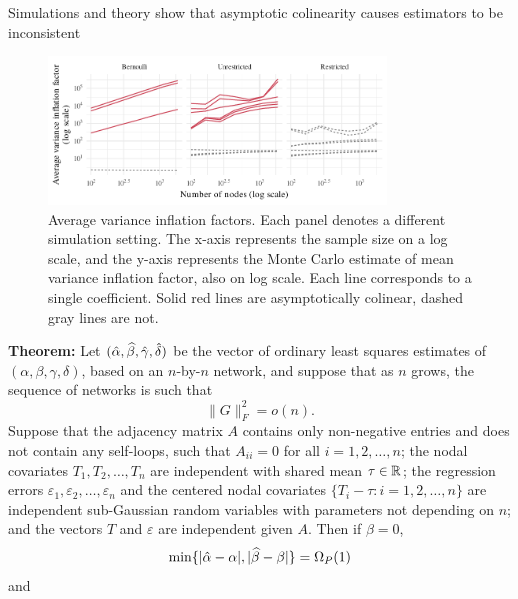 \documentclass[final]{beamer}
\newlength{\colwidth}
\begin{document}
\begin{frame}[t]
\begin{columns}[t]
\begin{column}{\colwidth}
\begin{block}{Simulations and theory show that asymptotic colinearity causes estimators to be inconsistent}
                \begin{figure}
                    \centering
                    \includegraphics[width=0.8\textwidth]{./figures/simulations/biometrika-vif.pdf}
                    \caption{Average variance inflation factors. Each panel denotes a different simulation setting. The x-axis represents the sample size on a log scale, and the y-axis represents the Monte Carlo estimate of mean variance inflation factor, also on log scale. Each line corresponds to a single coefficient. Solid red lines are asymptotically colinear, dashed gray lines are not.}
                    \label{fig:vif}
                \end{figure}
                \textbf{Theorem:} Let $(\hat{\alpha}, \widehat{\beta}, \hat{\gamma}, \hat{\delta})$ be the vector of ordinary least squares estimates of $(\alpha, \beta, \gamma, \delta)$, based on an $n$-by-$n$ network, and suppose that as $n$ grows, the sequence of networks is such that
                \begin{equation} \label{eq:frobG:growthbound}
                    \| G \|_F^2 = o( n ).
                \end{equation}
                Suppose that the adjacency matrix $A$ contains only non-negative entries and does not contain any self-loops, such that $A_{ii} = 0$ for all $i = 1, 2,\dots, n$; the nodal covariates $T_1,T_2,\dots,T_n$ are independent with shared mean $\tau \in \mathbb{R}$; the regression errors $\varepsilon_1, \varepsilon_2, \dots, \varepsilon_n$ and the centered nodal covariates $\{ T_i - \tau : i =1,2,\dots,n \}$ are independent sub-Gaussian random variables with parameters not depending on $n$; and the vectors $T$ and $\varepsilon$ are independent given $A$.
                Then if $\beta = 0$,
                \begin{equation*}
                    \min\{ |\alphahat-\alpha|, |\betahat-\beta| \}
                    = \Omegap{ 1 }
                \end{equation*}
                and
                \begin{equation} \label{eq:deltahat:LB}

\end{equation}
\end{block}
\end{column}
\end{columns}
\end{frame}
\end{document}
